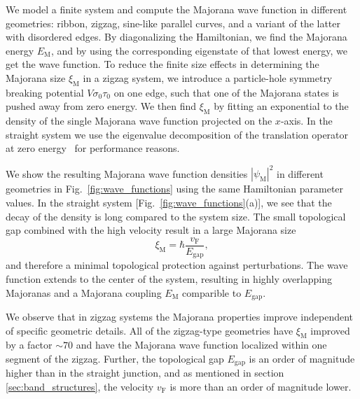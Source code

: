\documentclass[english, twocolumn, 10pt, aps, superscriptaddress, floatfix, prb, citeautoscript]{revtex4-1}
\renewcommand{\comment}[2]{#2}
\begin{document}
\comment{We calculate the wave functions and find the Majorana lengths by fitting an exponential.}
We model a finite system and compute the Majorana wave function in different geometries: ribbon, zigzag, sine-like parallel curves, and a variant of the latter with disordered edges.
By diagonalizing the Hamiltonian, we find the Majorana energy $E_\textrm{M}$, and by using the corresponding eigenstate of that lowest energy, we get the wave function.
To reduce the finite size effects in determining the Majorana size $\xi_\textrm{M}$ in a zigzag system, we introduce a particle-hole symmetry breaking potential $V \sigma_0 \tau_0$ on one edge, such that one of the Majorana states is pushed away from zero energy.
We then find $\xi_\textrm{M}$ by fitting an exponential to the density of the single Majorana wave function projected on the $x$-axis.
In the straight system we use the eigenvalue decomposition of the translation operator at zero energy~\cite{nijholt2015orbital} for performance reasons.

\comment{In a straight system, the Majoranas are very poorly localized because of small gap and high velocity}
We show the resulting Majorana wave function densities $\left| \psi_\textrm{M} \right|^2$ in different geometries in Fig.~\ref{fig:wave_functions} using the same Hamiltonian parameter values.
In the straight system [Fig.~\ref{fig:wave_functions}(a)], we see that the decay of the density is long compared to the system size.
The small topological gap combined with the high velocity result in a large Majorana size
\begin{equation}
\label{eq:xi_M}
\xi_\textrm{M}=\hbar \frac{v_\textrm{F}}{E_\textrm{gap}},
\end{equation}
and therefore a minimal topological protection against perturbations.
The wave function extends to the center of the system, resulting in highly overlapping Majoranas and a Majorana coupling $E_\textrm{M}$ comparible to $E_\textrm{gap}$.

\comment{In a zigzag geometry Majoranas are localized within one segment of zigzag independent of details}
We observe that in zigzag systems the Majorana properties improve independent of specific geometric details.
All of the zigzag-type geometries have $\xi_\textrm{M}$ improved by a factor $\sim 70$ and have the Majorana wave function localized within one segment of the zigzag.
Further, the topological gap $E_\textrm{gap}$ is an order of magnitude higher than in the straight junction, and as mentioned in section \ref{sec:band_structures}, the velocity $v_\textrm{F}$ is more than an order of magnitude lower.
\end{document}
